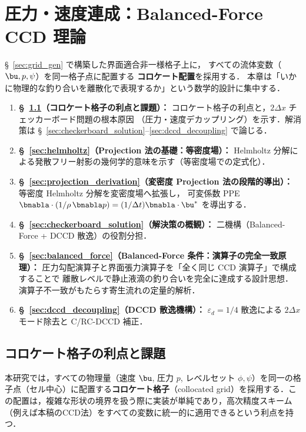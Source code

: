 \section{圧力・速度連成：Balanced-Force CCD 理論}
\label{sec:collocate}
\label{sec:pressure}%

§~\ref{sec:grid_gen} で構築した界面適合非一様格子上に，
すべての流体変数（$\bu, p, \psi$）を同一格子点に配置する
\textbf{コロケート配置}を採用する．
本章は「いかに物理的な釣り合いを離散化で表現するか」という数学的設計に集中する．

\begin{enumerate}
  \item \textbf{§~\ref{sec:collocate_layout}（コロケート格子の利点と課題）：}
        コロケート格子の利点と，$2\Delta x$ チェッカーボード問題の根本原因
        （圧力・速度デカップリング）を示す．解消策は §~\ref{sec:checkerboard_solution}--\ref{sec:dccd_decoupling} で論じる．
  \item \textbf{§~\ref{sec:helmholtz}（Projection 法の基礎：等密度場）：}
        Helmholtz 分解による発散フリー射影の幾何学的意味を示す（等密度場での定式化）．
  \item \textbf{§~\ref{sec:projection_derivation}（変密度 Projection 法の段階的導出）：}
        等密度 Helmholtz 分解を変密度場へ拡張し，
        可変係数 PPE $\bnabla\cdot(1/\rho\,\bnabla p) = (1/\Delta t)\bnabla\cdot\bu^*$ を導出する．
  \item \textbf{§~\ref{sec:checkerboard_solution}（解決策の概観）：}
        二機構（Balanced-Force + DCCD 散逸）の役割分担．
  \item \textbf{§~\ref{sec:balanced_force}（Balanced-Force 条件：演算子の完全一致原理）：}
        圧力勾配演算子と界面張力演算子を「全く同じ CCD 演算子」で構成することで
        離散レベルで静止液滴の釣り合いを完全に達成する設計思想．
        演算子不一致がもたらす寄生流れの定量的解析．
  \item \textbf{§~\ref{sec:dccd_decoupling}（DCCD 散逸機構）：}
        $\varepsilon_d=1/4$ 散逸による $2\Delta x$ モード除去と C/RC-DCCD 補正．
\end{enumerate}

\subsection{コロケート格子の利点と課題}
\label{sec:collocate_layout}
本研究では，すべての物理量（速度 $\bu$, 圧力 $p$, レベルセット $\phi, \psi$）を同一の格子点（セル中心）に配置する\textbf{コロケート格子}（collocated grid）を採用する．この配置は，複雑な形状の境界を扱う際に実装が単純であり，高次精度スキーム（例えば本稿のCCD法）をすべての変数に統一的に適用できるという利点を持つ．

